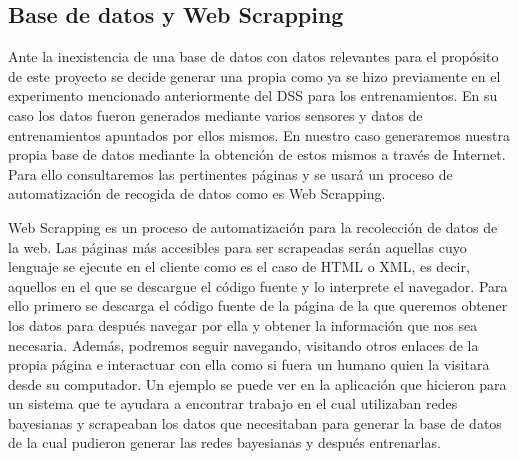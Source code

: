 \subsection{Base de datos y Web Scrapping}
Ante la inexistencia de una base de datos con datos relevantes para el propósito de este proyecto
 se decide generar una propia como ya se hizo previamente en el experimento mencionado anteriormente
 del DSS para los entrenamientos. En su caso los datos fueron generados mediante varios sensores y
 datos de entrenamientos apuntados por ellos mismos. En nuestro caso generaremos nuestra propia
 base de datos mediante la obtención de estos mismos a través de Internet. Para ello consultaremos
 las pertinentes páginas y se usará un proceso de automatización de recogida de datos como es
 Web Scrapping.

Web Scrapping es un proceso de automatización para la recolección de datos de la web. Las páginas
 más accesibles para ser scrapeadas serán aquellas cuyo lenguaje se ejecute en el cliente como
 es el caso de HTML o XML, es decir, aquellos en el que se descargue el código fuente y lo interprete
 el navegador. Para ello primero se descarga el código fuente de la página de la que queremos
 obtener los datos para después navegar por ella y obtener la información que nos sea necesaria.
 Además, podremos seguir navegando, visitando otros enlaces de la propia página e interactuar
 con ella como si fuera un humano quien la visitara desde su computador. Un ejemplo se puede
 ver en la aplicación que hicieron para un sistema que te ayudara a encontrar trabajo en el cual
 utilizaban redes bayesianas y scrapeaban los datos que necesitaban para generar la base de datos
 de la cual pudieron generar las redes bayesianas y después entrenarlas.
